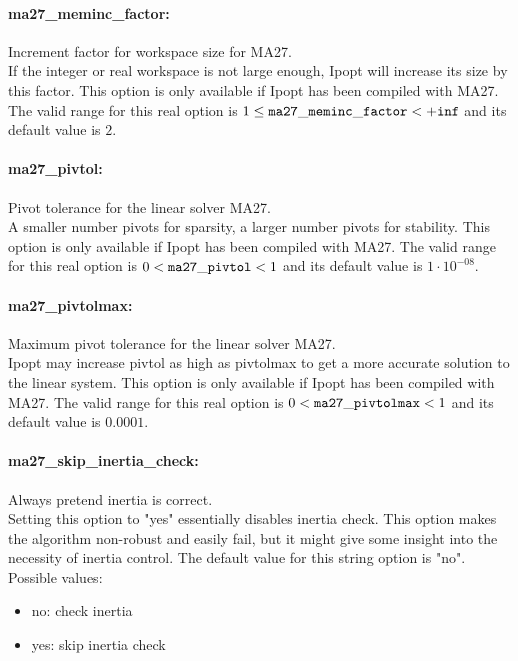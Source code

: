 \paragraph{ma27\_meminc\_factor:}\label{opt:ma27_meminc_factor} Increment factor for workspace size for MA27. \\
 If the integer or real workspace is not large enough, Ipopt will increase its size by this factor.  This option is only available if Ipopt has been compiled with MA27. The valid range for this real option is 
$1 \le {\tt ma27\_meminc\_factor } <  {\tt +inf}$
and its default value is $2$.


\paragraph{ma27\_pivtol:}\label{opt:ma27_pivtol} Pivot tolerance for the linear solver MA27. \\
 A smaller number pivots for sparsity, a larger number pivots for stability.  This option is only available if Ipopt has been compiled with MA27. The valid range for this real option is 
$0 <  {\tt ma27\_pivtol } <  1$
and its default value is $1 \cdot 10^{-08}$.


\paragraph{ma27\_pivtolmax:}\label{opt:ma27_pivtolmax} Maximum pivot tolerance for the linear solver MA27. \\
 Ipopt may increase pivtol as high as pivtolmax to get a more accurate solution to the linear system.  This option is only available if Ipopt has been compiled with MA27. The valid range for this real option is 
$0 <  {\tt ma27\_pivtolmax } <  1$
and its default value is $0.0001$.


\paragraph{ma27\_skip\_inertia\_check:}\label{opt:ma27_skip_inertia_check} Always pretend inertia is correct. \\
 Setting this option to "yes" essentially disables inertia check. This option makes the algorithm non-robust and easily fail, but it might give some insight into the necessity of inertia control. The default value for this string option is "no".
\\ 
Possible values:
\begin{itemize}
   \item no: check inertia
   \item yes: skip inertia check
\end{itemize}

